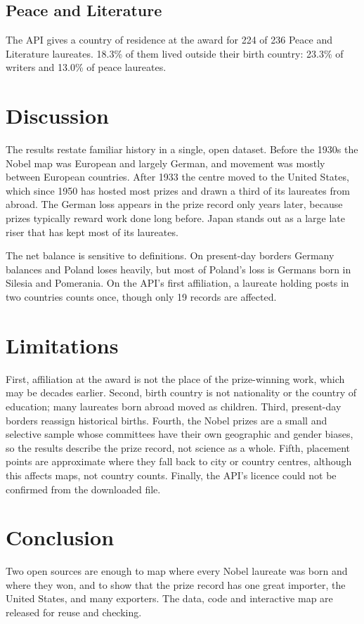 \documentclass[11pt,a4paper]{article}
\begin{document}
\subsection{Peace and Literature}
The API gives a country of residence at the award for 224 of 236 Peace and Literature laureates. 18.3\% of them lived outside their birth country: 23.3\% of writers and 13.0\% of peace laureates.

\section{Discussion}
The results restate familiar history in a single, open dataset. Before the 1930s the Nobel map was European and largely German, and movement was mostly between European countries. After 1933 the centre moved to the United States, which since 1950 has hosted most prizes and drawn a third of its laureates from abroad. The German loss appears in the prize record only years later, because prizes typically reward work done long before. Japan stands out as a large late riser that has kept most of its laureates.

The net balance is sensitive to definitions. On present-day borders Germany balances and Poland loses heavily, but most of Poland's loss is Germans born in Silesia and Pomerania. On the API's first affiliation, a laureate holding posts in two countries counts once, though only 19 records are affected.

\section{Limitations}
First, affiliation at the award is not the place of the prize-winning work, which may be decades earlier. Second, birth country is not nationality or the country of education; many laureates born abroad moved as children. Third, present-day borders reassign historical births. Fourth, the Nobel prizes are a small and selective sample whose committees have their own geographic and gender biases, so the results describe the prize record, not science as a whole. Fifth, placement points are approximate where they fall back to city or country centres, although this affects maps, not country counts. Finally, the API's licence could not be confirmed from the downloaded file.

\section{Conclusion}
Two open sources are enough to map where every Nobel laureate was born and where they won, and to show that the prize record has one great importer, the United States, and many exporters. The data, code and interactive map are released for reuse and checking.
\end{document}
